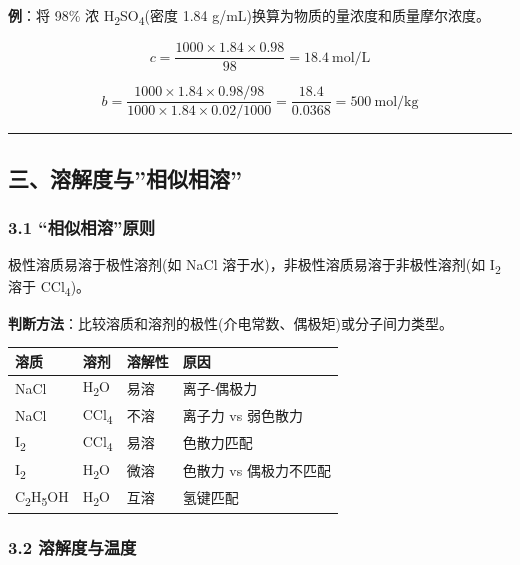 \documentclass[a4paper,11pt]{ctexart}
\newcounter{none}
\newcommand{\箭}{\ensuremath{\rightarrow}}
\newcommand{\左箭}{\ensuremath{\leftarrow}}
\newcommand{\上箭}{\ensuremath{\uparrow}}
\newcommand{\下箭}{\ensuremath{\downarrow}}
\newcommand{\衡}{\ensuremath{\rightleftharpoons}}
\newcommand{\双箭}{\ensuremath{\leftrightarrow}}
\newcommand{\约等于}{\ensuremath{\approx}}
\newcommand{\小于等于}{\ensuremath{\leq}}
\newcommand{\大于等于}{\ensuremath{\geq}}
\newcommand{\不等于}{\ensuremath{\neq}}
\newcommand{\西格马}{\ensuremath{\sigma}}
\newcommand{\派}{\ensuremath{\pi}}
\begin{document}
\textbf{例}：将 98\% 浓 H\textsubscript{2}SO\textsubscript{4}(密度 1.84 g/mL)换算为物质的量浓度和质量摩尔浓度。

\[
c = \frac{1000 \times 1.84 \times 0.98}{98} = 18.4\ \mathrm{mol/L}
\]

\[
b = \frac{1000 \times 1.84 \times 0.98 / 98}{1000 \times 1.84 \times 0.02 / 1000} = \frac{18.4}{0.0368} = 500\ \mathrm{mol/kg}
\]

\begin{center}\rule{0.5\linewidth}{0.5pt}\end{center}

\subsection{三、溶解度与''相似相溶''}\label{ux4e09ux6eb6ux89e3ux5ea6ux4e0eux76f8ux4f3cux76f8ux6eb6}

\subsubsection{3.1 ``相似相溶''原则}\label{ux76f8ux4f3cux76f8ux6eb6ux539fux5219}

极性溶质易溶于极性溶剂(如 NaCl 溶于水)，非极性溶质易溶于非极性溶剂(如 I\textsubscript{2} 溶于 CCl\textsubscript{4})。

\textbf{判断方法}：比较溶质和溶剂的极性(介电常数、偶极矩)或分子间力类型。

{\def\LTcaptype{none} %
\begin{longtable}[]{@{}llll@{}}
\toprule\noalign{}
溶质 & 溶剂 & 溶解性 & 原因 \\
\midrule\noalign{}
\endhead
\bottomrule\noalign{}
\endlastfoot
NaCl & H\textsubscript{2}O & 易溶 & 离子-偶极力 \\
NaCl & CCl\textsubscript{4} & 不溶 & 离子力 vs 弱色散力 \\
I\textsubscript{2} & CCl\textsubscript{4} & 易溶 & 色散力匹配 \\
I\textsubscript{2} & H\textsubscript{2}O & 微溶 & 色散力 vs 偶极力不匹配 \\
C\textsubscript{2}H\textsubscript{5}OH & H\textsubscript{2}O & 互溶 & 氢键匹配 \\
\end{longtable}
}

\subsubsection{3.2 溶解度与温度}\label{ux6eb6ux89e3ux5ea6ux4e0eux6e29ux5ea6}
\end{document}
